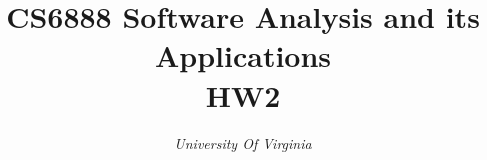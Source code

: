 \documentclass[conference]{IEEEtran}
\begin{document}
\title{CS6888 Software Analysis and its Applications \\ HW2\\
}

\author{
\textit{University Of Virginia}\\
}

\maketitle
\end{document}
